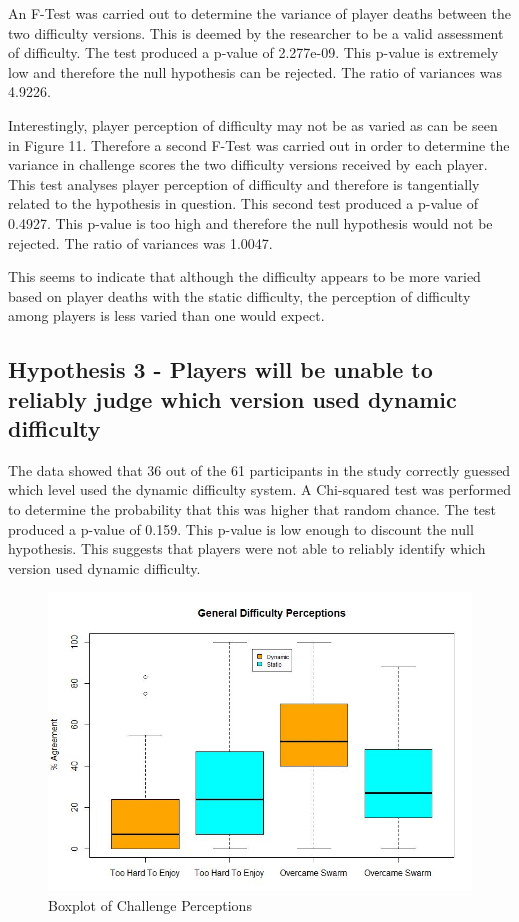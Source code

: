 \documentclass[journal]{IEEEtran}
\begin{document}
An F-Test was carried out to determine the variance of player deaths between the two difficulty versions. This is deemed by the researcher to be a valid assessment of difficulty. The test produced a p-value of 2.277e-09. This p-value is extremely low and therefore the null hypothesis can be rejected. The ratio of variances was 4.9226.

Interestingly, player perception of difficulty may not be as varied as can be seen in Figure 11.  Therefore a second F-Test was carried out in order to determine the variance in challenge scores the two difficulty versions received by each player. This test analyses player perception of difficulty and therefore is tangentially related to the hypothesis in question. This second test produced a p-value of 0.4927. This p-value is too high and therefore the null hypothesis would not be rejected. The ratio of variances was 1.0047.

This seems to indicate that although the difficulty appears to be more varied based on player deaths with the static difficulty, the perception of difficulty among players is less varied than one would expect.



\subsection{Hypothesis 3 - Players will be unable to reliably judge which version used dynamic difficulty}

The data showed that 36 out of the 61 participants in the study correctly guessed which level used the dynamic difficulty system. A Chi-squared test was performed to determine the probability that this was higher that random chance. The test produced a p-value of 0.159. This p-value is low enough to discount the null hypothesis. This suggests that players were not able to reliably identify which version used dynamic difficulty.



\begin{figure}[h]
	\includegraphics[width=1.0\linewidth]{difficultyperceptions.jpg}
	\caption{Boxplot of Challenge Perceptions}
	\label{Analysis Test}
\end{figure} 
\end{document}
